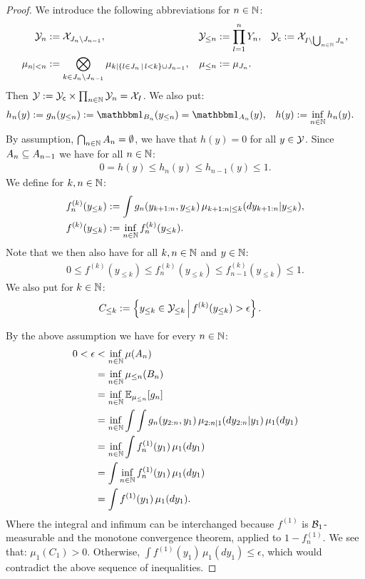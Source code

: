 \begin{Thm}
\begin{proof}
We introduce the following abbreviations for $n \in \mathbb{N}$:
\begin{align}
    \mathcal{Y}_n &:= \mathcal{X}_{J_n \setminus J_{n-1}}, & \mathcal{Y}_{\le n} &:= \prod_{l=1}^n Y_n, &
    \mathcal{Y}_{\mathsf{c}} &:= \mathcal{X}_{I \setminus \bigcup_{n \in \mathbb{N}} J_n},\\
    \mu_{n|<n} &:= \bigotimes_{k \in J_n \setminus J_{n-1}} \mu_{k|\left \{ l \in J_n \,\middle|\, l <k\right \} \cup J_{n-1}}, &     \mu_{\le n} &:= \mu_{J_n}. 
\end{align}
    Then $\mathcal{Y} := \mathcal{Y}_{\mathsf{c}} \times \prod_{n \in \mathbb{N}} \mathcal{Y}_n = \mathcal{X}_I$.
   We also put:
\begin{align}
    h_n(y) &:=  g_n(y_{\le n}) := \I_{B_n}(y_{\le n}) = \I_{A_n}(y), 
    & h(y) &:= \inf_{n \in \N} h_n(y).
\end{align}
    By assumption, $\bigcap_{n \in \mathbb{N}} A_n = \emptyset$, we have that $h(y) =0 $ for all $y \in \mathcal{Y}$.
    Since $A_n \subseteq A_{n-1}$ we have for all $n \in \mathbb{N}$:
    \begin{align}
        0 = h(y) \le   h_n(y) \le h_{n-1}(y) \le 1.
    \end{align}
We define for $k, n \in \mathbb{N}$:
\begin{align}
    f_n^{(k)}(y_{\le k}) &:= \int g_n(y_{k+1:n},y_{\le k})\, \mu_{k+1:n|\le k}(dy_{k+1:n}|y_{\le k}),\\
    f^{(k)}(y_{\le k}) &:= \inf_{n \in \mathbb{N}} f_n^{(k)}(y_{\le k}).
\end{align}
Note that we then also have for all $k, n \in \mathbb{N}$ and $y \in \mathbb{N}$:
    \begin{align}
        0 \le f^{(k)}(y_{\le k}) \le  f_n^{(k)}(y_{\le k})  \le f_{n-1}^{(k)}(y_{\le k})  \le 1.
    \end{align}
We also put for $k \in \mathbb{N}$:
    \begin{align}
        C_{\le k} &:= \left \{ y_{\le k} \in \mathcal{Y}_{\le k} \,\middle|\, f^{(k)}(y_{\le k}) > \epsilon \right \}.
    \end{align}

    By the above assumption we have for every $n \in \mathbb{N}$:
    \begin{align}
        0 < \epsilon &< \inf_{n \in \mathbb{N}} \mu(A_n) \\
        &= \inf_{n \in \mathbb{N}}  \mu_{\le n}(B_n)\\
        &=\inf_{n \in \mathbb{N}} \mathbb{E}_{\mu_{\le n}}[g_n] \\
        &=\inf_{n \in \mathbb{N}} \int \int g_n(y_{2:n},y_1)  \, \mu_{2:n|1}(dy_{2:n}|y_1) \, \mu_1(dy_1)\\
        &=\inf_{n \in \mathbb{N}} \int f_n^{(1)}(y_1) \, \mu_1(dy_1)\\
        &= \int \inf_{n \in \mathbb{N}} f_n^{(1)}(y_1) \, \mu_1(dy_1)\\
        &= \int f^{(1)}(y_1) \, \mu_1(dy_1).
    \end{align}
Where the integral and infimum can be interchanged because $f^{(1)}$ is $\mathcal{B}_1$-measurable and the monotone convergence theorem, applied to $1-f_n^{(1)}$.
    We see that: $\mu_1(C_1) > 0$. Otherwise, $\int f^{(1)}(y_1) \, \mu_1(dy_1) \le \epsilon$, which would contradict the above sequence of inequalities.


\end{proof}
\end{Thm}
